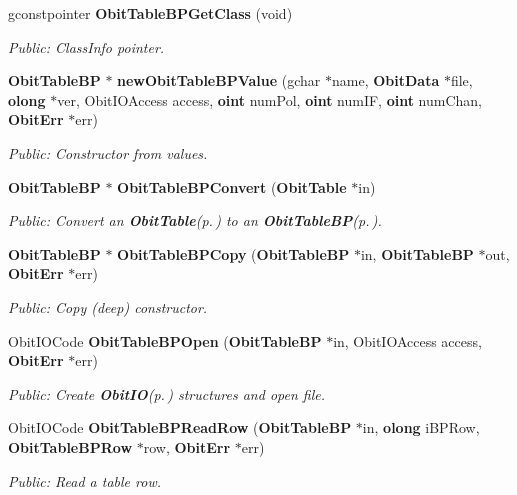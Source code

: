 \begin{CompactItemize}
gconstpointer {\bf Obit\-Table\-BPGet\-Class} (void)
\begin{CompactList}\small\item\em Public: Class\-Info pointer. \item\end{CompactList}\item 
{\bf Obit\-Table\-BP} $\ast$ {\bf new\-Obit\-Table\-BPValue} (gchar $\ast$name, {\bf Obit\-Data} $\ast$file, {\bf olong} $\ast$ver, Obit\-IOAccess access, {\bf oint} num\-Pol, {\bf oint} num\-IF, {\bf oint} num\-Chan, {\bf Obit\-Err} $\ast$err)
\begin{CompactList}\small\item\em Public: Constructor from values. \item\end{CompactList}\item 
{\bf Obit\-Table\-BP} $\ast$ {\bf Obit\-Table\-BPConvert} ({\bf Obit\-Table} $\ast$in)
\begin{CompactList}\small\item\em Public: Convert an {\bf Obit\-Table}{\rm (p.\,\pageref{structObitTable})} to an {\bf Obit\-Table\-BP}{\rm (p.\,\pageref{structObitTableBP})}. \item\end{CompactList}\item 
{\bf Obit\-Table\-BP} $\ast$ {\bf Obit\-Table\-BPCopy} ({\bf Obit\-Table\-BP} $\ast$in, {\bf Obit\-Table\-BP} $\ast$out, {\bf Obit\-Err} $\ast$err)
\begin{CompactList}\small\item\em Public: Copy (deep) constructor. \item\end{CompactList}\item 
Obit\-IOCode {\bf Obit\-Table\-BPOpen} ({\bf Obit\-Table\-BP} $\ast$in, Obit\-IOAccess access, {\bf Obit\-Err} $\ast$err)
\begin{CompactList}\small\item\em Public: Create {\bf Obit\-IO}{\rm (p.\,\pageref{structObitIO})} structures and open file. \item\end{CompactList}\item 
Obit\-IOCode {\bf Obit\-Table\-BPRead\-Row} ({\bf Obit\-Table\-BP} $\ast$in, {\bf olong} i\-BPRow, {\bf Obit\-Table\-BPRow} $\ast$row, {\bf Obit\-Err} $\ast$err)
\begin{CompactList}\small\item\em Public: Read a table row. \item\end{CompactList}\item 

\end{CompactItemize}
